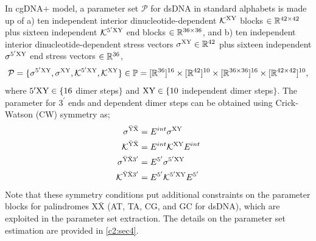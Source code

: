 In cgDNA$+$ model, a parameter set $\mathcal{P}$ for dsDNA in standard alphabets is made up of a) ten independent interior dinucleotide-dependent ${\mathcal K}^{{\text{XY}}}$  blocks $\in {\mathbb R}^{42 \times 42}$ plus sixteen independent ${\mathcal K}^{5^\prime{\text{XY}}}$ end blocks $\in {\mathbb R}^{36 \times 36}$, and b) ten independent interior dinucleotide-dependent stress vectors $\sigma^{{\text{XY}}} \in {\mathbb R}^{42} $ plus sixteen independent $\sigma^{5^\prime{\text{XY}}}$ end stress vectors $\in {\mathbb R}^{36}$,
\begin{equation}
\mathcal{P} = \{ \sigma^{5^\prime{\text{XY}}},  \sigma^{{\text{XY}}}, {\mathcal K}^{5^\prime{\text{XY}}}, {\mathcal K}^{{\text{XY}}} \} \in
{\mathbb P} = [{\mathbb R}^{36}]^{16} \times [{\mathbb R}^{42}]^{10} \times [{\mathbb R}^{36 \times 36}]^{16} \times [{\mathbb R}^{42 \times 42}]^{10},
\label{c2:eq9}
\end{equation}
where $5^\prime{\text{XY}} \in\{16$ dimer steps$\}$ and ${\text{XY}} \in\{10$ independent dimer steps$\}$. The parameter for $3^\prime$ ends and dependent dimer steps can be obtained using Crick-Watson (CW) symmetry as; 
\begin{equation}
\begin{split}
\sigma^{\bar{\text{Y}}\bar{\text{X}}}  &= E^{int}\sigma^{{\text{XY}}}\\
{\mathcal K}^{\bar{\text{Y}}\bar{\text{X}}} &=  E^{int}{\mathcal K}^{{\text{XY}}}E^{int}  \\
\sigma^{\bar{\text{Y}}\bar{\text{X}}3^\prime}  &= E^{5^\prime}\sigma^{5^\prime{\text{XY}}}\\
{\mathcal K}^{\bar{\text{Y}}\bar{\text{X}}3^\prime} &=  E^{5^\prime}{\mathcal K}^{5^\prime{\text{XY}}}E^{5^\prime}  \end{split}
\label{c2:eq_CW_in_Prm}    
\end{equation}
Note that these symmetry conditions put additional constraints on the parameter blocks for palindromes X$\bar{\text{X}}$ (AT, TA, CG, and GC for dsDNA), which are exploited in the parameter set extraction. 
The details on the parameter set estimation are provided in \cref{c2:sec4}.
 
